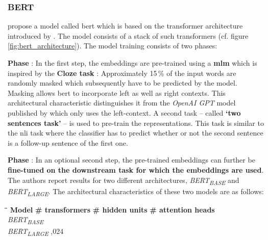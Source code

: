 \subsubsection{BERT}
\label{sec:bert}

\citep{Devlin.2018} propose a model called \gls{bert} which is based on the transformer architecture introduced by \citep{Vaswani.2017}. The model consists of a stack of such transformers (cf. figure \vref{fig:bert_architecture}). The model training consists of two phases: 

\textbf{Phase} : In the first step, the embeddings are pre-trained using a \textbf{\gls{mlm}} which is inspired by the \textbf{Cloze task} \citep{Taylor.1953}: Approximately 15\,\% of the input words are randomly masked which subsequently have to be predicted by the model. Masking allows \gls{bert} to incorporate left as well as right contexts. This architectural characteristic distinguishes it from the \textit{OpenAI GPT} model published by \citep{Radford.2018} which only uses the left-context. A second task -- called \textbf{`two sentences task'} -- is used to pre-train the representations. This task is similar to the \gls{nli} task where the classifier has to predict whether or not the second sentence is a follow-up sentence of the first one.



\textbf{Phase} : In an optional second step, the pre-trained embeddings can further be \textbf{fine-tuned on the downstream task for which the embeddings are used}. The authors report results for two different architectures, \textit{BERT\textsubscript{BASE}} and \textit{BERT\textsubscript{LARGE}}. The architectural characteristics of these two models are as follows:

\begin{center}\parbox{0cm}{
\begin{tabbing}
	\hspace*{3.5cm}\=\hspace*{4.5cm}\=\hspace*{5.5cm}\=\kill
	\textbf{Model} 	\>	\textbf{\# transformers} 	\>	\textbf{\# hidden units} 	\> 	\textbf{\# attention heads} 	\\[2mm]
	\textit{BERT\textsubscript{BASE}}
					\>	12						\>	768 												\\[1mm]
	\textit{BERT\textsubscript{LARGE}}
											,024					
\end{tabbing}}
\end{center}
\vspace*{-5mm}

